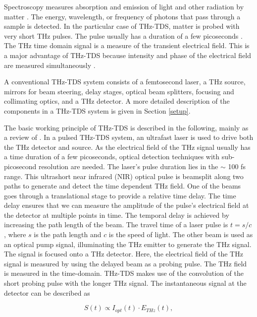 Spectroscopy measures absorption and emission of light and other radiation by matter \cite{atascientificUnderstandingSpectrometrySpectroscopy2020}. The energy, wavelength, or frequency of photons that pass through a sample is detected. In the particular case of THz-TDS, matter is probed with very short THz pulses. The pulse usually has a duration of a few picoseconds \cite{neuTutorialIntroductionTerahertz2018}. The THz time domain signal is a measure of the transient electrical field. This is a major advantage of THz-TDS because intensity and phase of the electrical field are measured simultaneously \cite{zhaoPrincipleTerahertzTimeDomain2023}.

A conventional THz-TDS system consists of a femtosecond laser, a THz source, mirrors for beam steering, delay stages, optical beam splitters, focusing and collimating optics, and a THz detector. A more detailed description of the components in a THz-TDS system is given in Section \ref{setup}.

The basic working principle of THz-TDS is described in the following, mainly as a review of \cite{neuTutorialIntroductionTerahertz2018,PrinciplesTerahertzScience2009,nandiErAsInAlGaAsPhotoconductors2021}. 
In a pulsed THz-TDS system, an ultrafast laser is used to drive both the THz detector and source. As the electrical field of the THz signal usually has a time duration of a few picoseconds, optical detection techniques with sub-picosecond resolution are needed. The laser's pulse duration lies in the $\sim$ \num{100} \si{\femto\s} range. This ultrashort near infrared (NIR) optical pulse is beamsplit along two paths to generate and detect the time dependent THz field. One of the beams goes through a translational stage to provide a relative time delay. The time delay ensures that we can measure the amplitude of the pulse's electrical field at the detector at multiple points in time. The temporal delay is achieved by increasing the path length of the beam. The travel time of a laser pulse is $t = s/c$, where $s$ is the path length and $c$ is the speed of light. The other beam is used as an optical pump signal, illuminating the THz emitter to generate the THz signal. The signal is focused onto a THz detector. Here, the electrical field of the THz signal is measured by using the delayed beam as a probing pulse. The THz field is measured in the time-domain. THz-TDS makes use of the convolution of the short probing pulse with the longer THz signal. The instantaneous signal at the detector can be described as 

\begin{equation}
	S(t) \propto I_{opt}(t)\cdot E_{THz}(t),
\end{equation}

